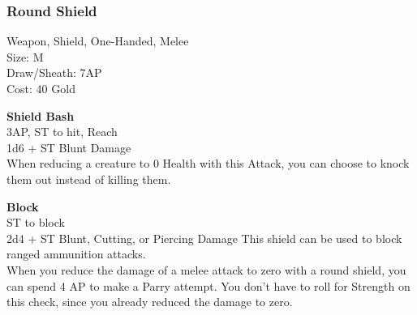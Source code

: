 \subsubsection{Round Shield}\label{weapon:roundShield}
Weapon, Shield, One-Handed, Melee\\
Size: M\\
Draw/Sheath: 7AP\\
Cost: 40 Gold

\textbf{Shield Bash}\\
3AP, ST to hit,  Reach\\
1d6 + \texttimes ST Blunt Damage\\
When reducing a creature to 0 Health with this Attack, you can choose to knock them out instead of killing them.

\textbf{Block}\\
ST to block\\
2d4 + \texttimes ST Blunt, Cutting, or Piercing Damage
This shield can be used to block ranged ammunition attacks.\\
When you reduce the damage of a melee attack to zero with a round shield, you can spend 4 AP to make a Parry attempt.
You don't have to roll for Strength on this check, since you already reduced the damage to zero.\\
